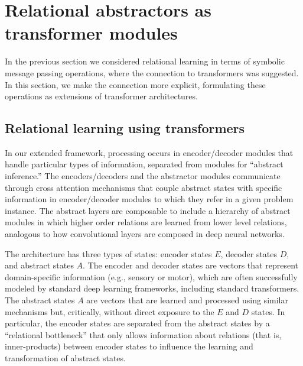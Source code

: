 
\section{Relational abstractors as transformer modules}
\label{sec:abstractors_as_transformer_modules}

In the previous section we considered relational learning
in terms of symbolic message passing operations, where the connection to transformers 
was suggested. In this section, we make the connection more explicit, formulating 
these operations as extensions of transformer architectures.



\subsection{Relational learning using transformers}

In our extended framework, processing occurs in encoder/decoder modules that handle particular types of information, separated from modules for ``abstract inference.'' The encoders/decoders and the abstractor modules communicate through cross attention mechanisms that couple abstract states with specific information in encoder/decoder modules to which they refer in a given problem instance.  The abstract layers are composable to include a hierarchy of abstract modules in which higher order relations are learned from lower level relations, analogous to how convolutional layers are composed in deep neural networks.

The architecture has three types of states: encoder states $E$, decoder states $D$, and abstract states $A$. The encoder and decoder states are vectors
that represent domain-specific information (e.g., sensory or motor), which are often successfully modeled
by standard deep learning frameworks, including standard transformers. The abstract states $A$ are vectors
that are learned and processed using similar mechanisms but, critically, without direct exposure to the $E$ and $D$ states.  In particular, the encoder states are separated from the abstract states by a ``relational bottleneck''
that only allows information about relations (that is, inner-products) between encoder
states to influence the learning and transformation of abstract states.

